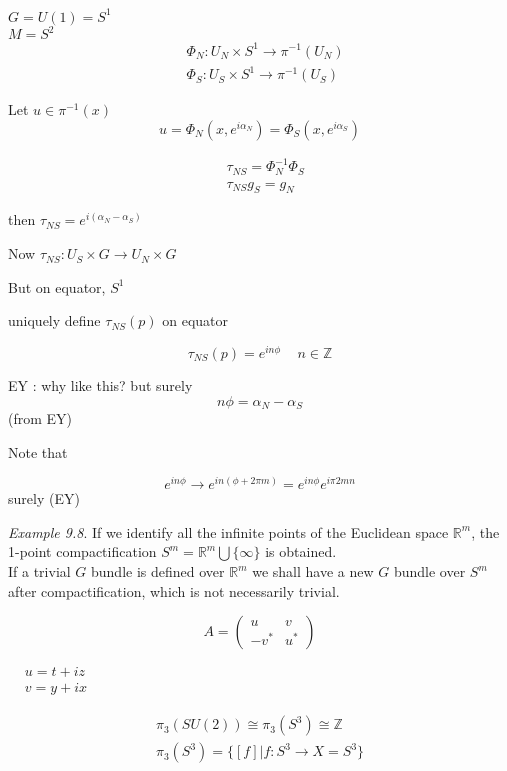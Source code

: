 \documentclass[twoside]{amsart}
\begin{document}
$G = U(1) = S^1$ \\
$M=S^2$ \\

\[
\begin{aligned}
  & \Phi_N : U_N \times S^1 \to \pi^{-1}{ (U_N) } \\ 
  & \Phi_S : U_S \times S^1 \to \pi^{-1}{ (U_S) } 
\end{aligned}
\]

Let $u\in \pi^{-1}{ (x)}$ 
\[
u = \Phi_N(x,e^{i \alpha_N} ) = \Phi_S( x, e^{ i \alpha_S } )
\]

\[
\begin{aligned}
  & \tau_{NS} = \Phi_N^{-1} \Phi_S \\ 
  & \tau_{NS}g_S = g_N
\end{aligned}
\]

then $\tau_{NS} = e^{ i (\alpha_N - \alpha_S)}$

Now $\tau_{NS}: U_S \times G \to U_N \times G$  

But on equator, $S^1$

uniquely define $\tau_{NS}(p)$ on equator 

\[
\tau_{NS}(p) = e^{i n \phi } \quad \, n \in \mathbb{Z}
\]

EY : why like this? but surely
\[
n\phi = \alpha_N - \alpha_S 
\]
(from EY)

Note that 

\[
e^{in\phi}  \to e^{ i n (\phi + 2 \pi m ) } = e^{in \phi } e^{i \pi 2mn }
\]
surely (EY)


\emph{Example 9.8}. If we identify all the infinite points of the Euclidean space $\mathbb{R}^m$, the 1-point compactification $S^m = \mathbb{R}^m \bigcup \lbrace \infty \rbrace$ is obtained.  \\
If a trivial $G$ bundle is defined over $\mathbb{R}^m$ we shall have a new $G$ bundle over $S^m$ after compactification, which is not necessarily trivial.  


\[
A = \left( \begin{matrix} u & v \\ 
  -v^* & u^* \end{matrix} \right)
\]

$\begin{aligned}
  & u = t+iz \\
  & v = y + ix \end{aligned}$

\[
\begin{gathered}
  \pi_3(SU(2)) \cong \pi_3(S^3) \cong \mathbb{Z} \\ 
  \pi_3(S^3) = \lbrace [f] | f: S^3 \to X = S^3 \rbrace
\end{gathered}
\]
\end{document}
